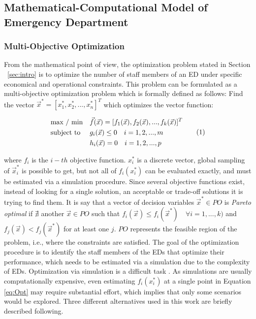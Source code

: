 \documentclass[11pt]{article} %
\begin{document}
\subsection{Mathematical-Computational Model of Emergency Department}
\label{ssec:math-comp}

\subsubsection{Multi-Objective Optimization}
\label{sssec:mop}

From the mathematical point of view, the optimization problem stated in Section ~\ref{sec:intro} is to optimize the number of staff members of an ED under specific economical and operational constraints. This problem can be formulated as a multi-objective optimization problem which is formally defined as follows: 
Find the vector $ \vec{x}^* = [ x^*_1 , x^*_2 ,..., x^*_n ]^T $ which optimizes the vector function:

\vspace{-0.05cm}
\begin{equation*}  \label{eq:Opt}
\vspace{-0.05cm}
\begin{aligned}
& {\text{max / min}}
& & \vec{f}(\vec{x}) = [ f_1(\vec{x}), f_2(\vec{x}), ..., f_k(\vec{x})]^T \\
& \text{subject to}
& & g_i(\vec{x}) \leq 0 \quad  i = 1,2,...,m \\
& &  & h_i(\vec{x}) = 0 \quad i = 1,2,...,p
\end{aligned}
\tag{1}
\end{equation*}

\noindent where $f_i$ is the $i-th$ objective function.  $x^*_i$ is a discrete vector, global sampling of $\vec{x}^*_i$ is possible to get, but not all of $f_i(x^*_i)$ can be evaluated exactly, and must be estimated via a simulation procedure. Since  several objective functions exist, instead of looking for a single solution, an acceptable or trade-off solutions it is trying to find them. It is say that a vector of decision variables $ \vec{x}^* \in PO$ is {\it Pareto optimal} if $ \nexists $ another $ \vec{x} \in PO $ such that $ f_i(\vec{x}) \leq f_i(\vec{x}^*) \quad  \forall i=1,...,k ) $ and $ f_j(\vec{x}) < f_j(\vec{x}^*)$ for at least one $j$. $PO$ represents the feasible region of the problem,  i.e., where the constraints are satisfied. The goal of the optimization procedure is to identify the staff members of the EDs that optimize their performance, which needs to be estimated via a simulation due to the complexity of EDs. Optimization via simulation is a difficult task \cite{Fu:2002p192}. As simulations are usually computationally expensive, even estimating $f_i(x^*_i) $ at a single point in Equation \eqref{eq:Opt} may require substantial effort, which implies that only some scenarios would be explored. Three different alternatives used in this work are briefly described following. 
\end{document}
